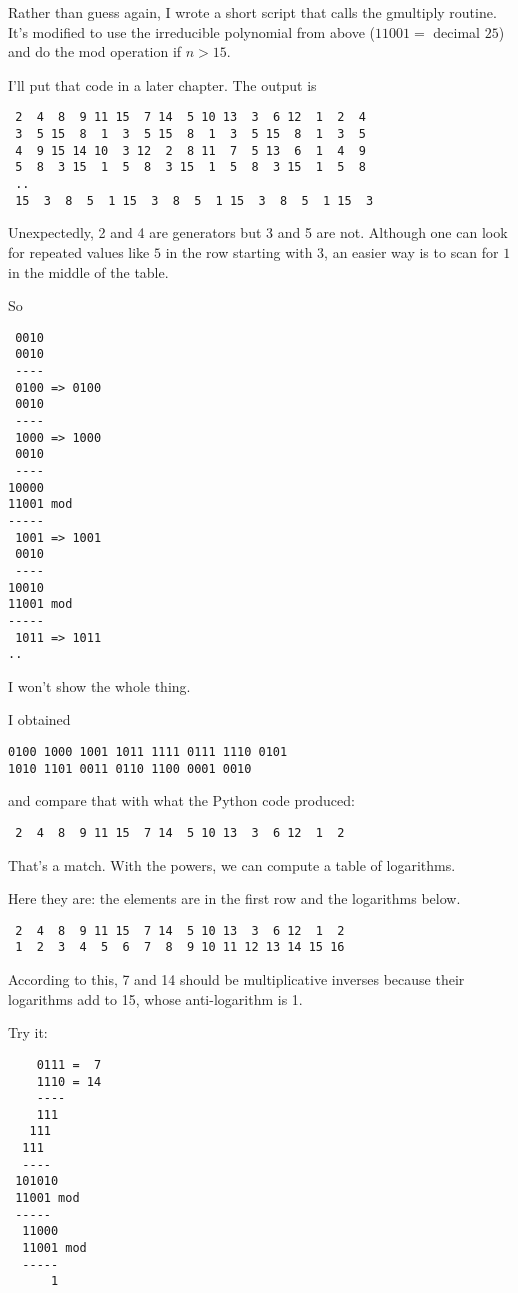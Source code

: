 \documentclass[11pt, oneside]{article}
\begin{document}
Rather than guess again, I wrote a short script that calls the gmultiply routine.  It's modified to use the irreducible polynomial from above ($11001 =$ decimal $25$) and do the mod operation if $n > 15$.  

I'll put that code in a later chapter.  The output is

\begin{verbatim}
 2  4  8  9 11 15  7 14  5 10 13  3  6 12  1  2  4
 3  5 15  8  1  3  5 15  8  1  3  5 15  8  1  3  5
 4  9 15 14 10  3 12  2  8 11  7  5 13  6  1  4  9
 5  8  3 15  1  5  8  3 15  1  5  8  3 15  1  5  8
 ..
 15  3  8  5  1 15  3  8  5  1 15  3  8  5  1 15  3
\end{verbatim}

Unexpectedly, 2 and 4 are generators but 3 and 5 are not.  Although one can look for repeated values like $5$ in the row starting with $3$, an easier way is to scan for $1$ in the middle of the table.

So
\begin{verbatim}
 0010
 0010
 ----
 0100 => 0100
 0010
 ----
 1000 => 1000
 0010
 ----
10000
11001 mod
-----
 1001 => 1001
 0010
 ----
10010
11001 mod
-----
 1011 => 1011
..
\end{verbatim}
I won't show the whole thing.

I obtained
\begin{verbatim} 
0100 1000 1001 1011 1111 0111 1110 0101
1010 1101 0011 0110 1100 0001 0010
\end{verbatim}
and compare that with what the Python code produced:
\begin{verbatim}
 2  4  8  9 11 15  7 14  5 10 13  3  6 12  1  2
\end{verbatim}

That's a match.  With the powers, we can compute a table of logarithms.  

Here they are:  the elements are in the first row and the logarithms below.
\begin{verbatim}
 2  4  8  9 11 15  7 14  5 10 13  3  6 12  1  2
 1  2  3  4  5  6  7  8  9 10 11 12 13 14 15 16
\end{verbatim}

According to this, 7 and 14 should be multiplicative inverses because their logarithms add to 15, whose anti-logarithm is 1.

Try it:

\begin{verbatim}
    0111 =  7
    1110 = 14
    ----
    111
   111
  111
  ----
 101010
 11001 mod
 -----
  11000
  11001 mod
  -----
      1
\end{verbatim}
\end{document}
